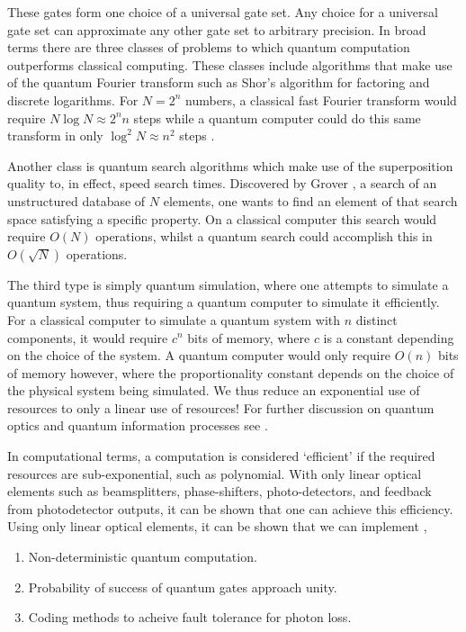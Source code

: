 \documentclass[aps,pra,twocolumn,amsmath,amssymb,nofootinbib,superscriptaddress]{revtex4}
\begin{document}
These gates form one choice of a universal gate set. Any choice for a universal gate set can approximate any other gate set to arbitrary precision. In broad terms there are three classes of problems to which quantum computation outperforms classical computing. These classes include algorithms that make use of the quantum Fourier transform such as Shor's algorithm for factoring and discrete logarithms. For $ N=2^n$ numbers, a classical fast Fourier transform would require $ N \log{N} \approx 2^n n$ steps while a quantum computer could do this same transform in only $\log^2{N} \approx n^2$ steps \cite{nielsen}.

Another class is quantum search algorithms which make use of the superposition quality to, in effect, speed search times. Discovered by Grover \cite{grover}, a search of an unstructured database of $N$ elements, one wants to find an element of that search space satisfying a specific property. On a classical computer this search would require $O(N)$ operations, whilst a quantum search could accomplish this in $O(\sqrt{N})$ operations.

The third type is simply quantum simulation, where one attempts to simulate a quantum system, thus requiring a quantum computer to simulate it efficiently. For a classical computer to simulate a quantum system with $n$ distinct components, it would require $c^n$ bits of memory, where $c$ is a constant depending on the choice of the system. A quantum computer would only require $O(n)$ bits of memory however, where the proportionality constant depends on the choice of the physical system being simulated. We thus reduce an exponential use of resources to only a linear use of resources! For further discussion on quantum optics and quantum information processes see \cite{walls,aharonov,diVincenzo}.

In computational terms, a computation is considered `efficient' if the required resources are sub-exponential, such as polynomial. With only linear optical elements such as beamsplitters, phase-shifters, photo-detectors, and feedback from photodetector outputs, it can be shown that one can achieve this efficiency. Using only linear optical elements, it can be shown that we can implement \cite{knill},
\begin{enumerate}
\item{Non-deterministic quantum computation.} 
\item{Probability of success of quantum gates approach unity.}
\item{Coding methods to acheive fault tolerance for photon loss.} 
\end{enumerate}
\end{document}
